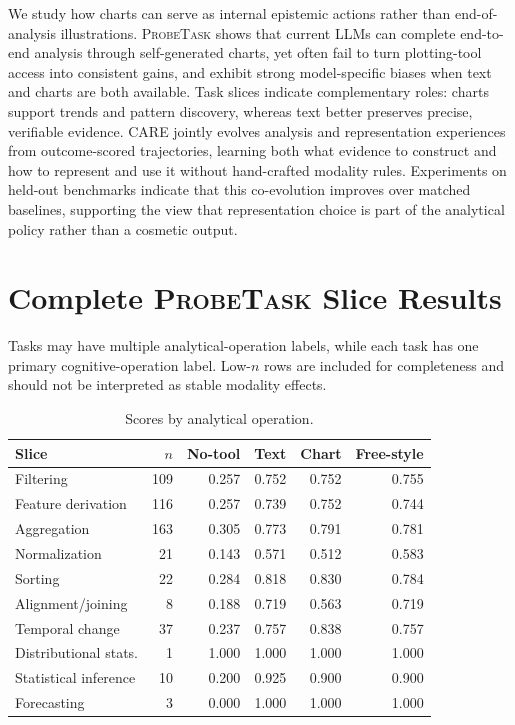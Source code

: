 \documentclass{article}
\newcommand{\method}{\textsc{CARE}}
\newcommand{\probe}{\textsc{ProbeTask}}
\begin{document}
We study how charts can serve as internal epistemic actions rather than end-of-analysis illustrations.
\probe{} shows that current LLMs can complete end-to-end analysis through self-generated charts, yet often fail to turn plotting-tool access into consistent gains, and exhibit strong model-specific biases when text and charts are both available.
Task slices indicate complementary roles: charts support trends and pattern discovery, whereas text better preserves precise, verifiable evidence.
\method{} jointly evolves analysis and representation experiences from outcome-scored trajectories, learning both what evidence to construct and how to represent and use it without hand-crafted modality rules.
Experiments on held-out benchmarks indicate that this co-evolution improves over matched baselines, supporting the view that representation choice is part of the analytical policy rather than a cosmetic output.





\appendix

\section{Complete \probe{} Slice Results}
\label{app:slices}

Tasks may have multiple analytical-operation labels, while each task has one primary cognitive-operation label.
Low-$n$ rows are included for completeness and should not be interpreted as stable modality effects.

\begin{table}[h]
  \caption{Scores by analytical operation.}
  \label{tab:operation-slices}
  \centering
  \scriptsize
  \setlength{\tabcolsep}{3.5pt}
  \begin{tabular}{lrrrrr}
    \toprule
    Slice & $n$ & No-tool & Text & Chart & Free-style \\
    \midrule
    Filtering             & 109 & 0.257 & 0.752 & 0.752 & 0.755 \\
    Feature derivation    & 116 & 0.257 & 0.739 & 0.752 & 0.744 \\
    Aggregation           & 163 & 0.305 & 0.773 & 0.791 & 0.781 \\
    Normalization         &  21 & 0.143 & 0.571 & 0.512 & 0.583 \\
    Sorting               &  22 & 0.284 & 0.818 & 0.830 & 0.784 \\
    Alignment/joining     &   8 & 0.188 & 0.719 & 0.563 & 0.719 \\
    Temporal change       &  37 & 0.237 & 0.757 & 0.838 & 0.757 \\
    Distributional stats. &   1 & 1.000 & 1.000 & 1.000 & 1.000 \\
    Statistical inference &  10 & 0.200 & 0.925 & 0.900 & 0.900 \\
    Forecasting           &   3 & 0.000 & 1.000 & 1.000 & 1.000 \\
    \bottomrule
  \end{tabular}
\end{table}
\end{document}
